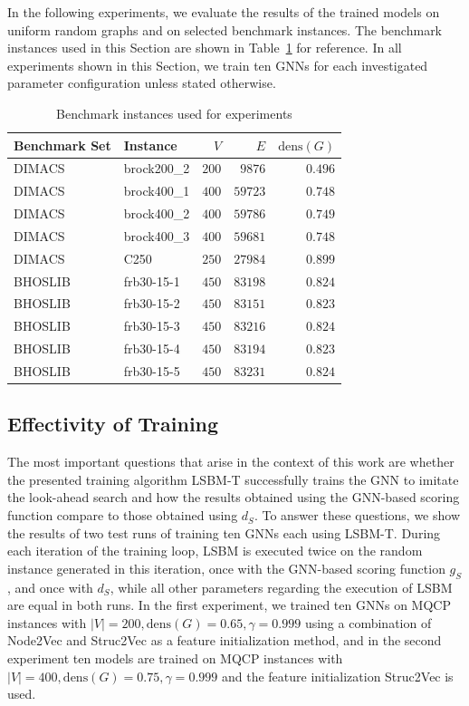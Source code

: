 \documentclass[draft,final]{vutinfth} %
\begin{document}
In the following experiments, we evaluate the results of the trained models on uniform random graphs and on selected benchmark instances. 
The benchmark instances used in this Section are shown in Table~\ref{tab:benchmark-instances-for-experiments} for reference. In all experiments shown in this Section, we train ten GNNs for each investigated parameter configuration unless stated otherwise. 

\begin{table}
    \centering
    \begin{tabular}{llrrr}
        Benchmark Set & Instance & $V$ & $E$ & $\mathrm{dens}(G)$  \\ \hline
        DIMACS & brock200\_2 & $200$ & $9876$ & $0.496$\\
        DIMACS & brock400\_1 & $400$ & $59723$ & $0.748$\\
        DIMACS & brock400\_2 & $400$ & $59786$ & $0.749$\\
        DIMACS & brock400\_3 & $400$ & $59681$ & $0.748$\\
        DIMACS & C250 & $250$ & $27984$ & $0.899$\\
        BHOSLIB & frb30-15-1 & $450$ & $83198$ & $0.824$\\
        BHOSLIB & frb30-15-2 & $450$ & $83151$ & $0.823$\\
        BHOSLIB & frb30-15-3 & $450$ & $83216$ & $0.824$\\
        BHOSLIB & frb30-15-4 & $450$ & $83194$ & $0.823$\\
        BHOSLIB & frb30-15-5 & $450$ & $83231$ & $0.824$\\
    \end{tabular}
    \caption{Benchmark instances used for experiments}
    \label{tab:benchmark-instances-for-experiments}
\end{table}

\subsection{Effectivity of Training}\label{sec:training-eval}
The most important questions that arise in the context of this work are whether the presented training algorithm LSBM-T successfully trains the GNN to imitate the look-ahead search and how the results obtained using the GNN-based scoring function compare to those obtained using $d_S$. 
To answer these questions, we show the results of two test runs of training ten GNNs each using LSBM-T. During each iteration of the training loop, LSBM is executed twice on the random instance generated in this iteration, once with the GNN-based scoring function $g_S$, and once with $d_S$, while all other parameters regarding the execution of LSBM are equal in both runs. 
In the first experiment, we trained ten GNNs on MQCP instances with $|V|=200, \mathrm{dens}(G)=0.65, \gamma=0.999$ using a combination of Node2Vec and Struc2Vec as a feature initialization method, and in the second experiment ten models are trained on MQCP instances with $|V|=400, \mathrm{dens}(G)=0.75, \gamma=0.999$ and the feature initialization Struc2Vec is used. 
\end{document}
